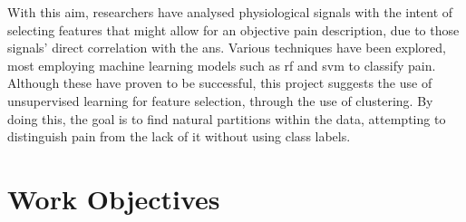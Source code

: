 With this aim, researchers have analysed physiological signals with the intent of selecting features that might allow for an objective pain description, due to those signals' direct correlation with the \ac{ans}. Various techniques have been explored, most employing machine learning models such as \ac{rf} and \ac{svm} to classify pain. Although these have proven to be successful, this project suggests the use of unsupervised learning for feature selection, through the use of clustering. By doing this, the goal is to find natural partitions within the data, attempting to distinguish pain from the lack of it without using class labels.


\section{Work Objectives}









